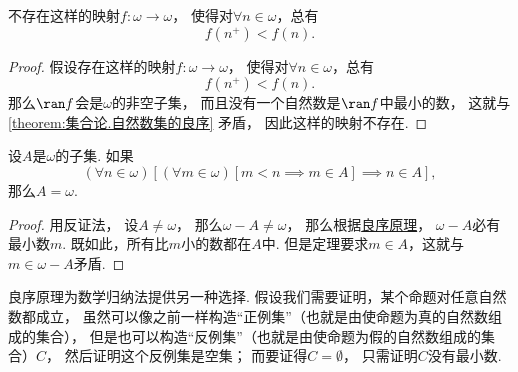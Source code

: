 \begin{theorem}
不存在这样的映射\(f\colon\omega\to\omega\)，
使得对\(\forall n \in \omega\)，总有\begin{equation*}
	f(n^+) < f(n).
\end{equation*}
\begin{proof}
假设存在这样的映射\(f\colon\omega\to\omega\)，
使得对\(\forall n \in \omega\)，总有\begin{equation*}
	f(n^+) < f(n).
\end{equation*}
那么\(\ran f\)会是\(\omega\)的非空子集，
而且没有一个自然数是\(\ran f\)中最小的数，
这就与\cref{theorem:集合论.自然数集的良序} 矛盾，
因此这样的映射不存在.
\end{proof}
\end{theorem}

\begin{theorem}[强归纳原理]\label{theorem:集合论.归纳原理2}
设\(A\)是\(\omega\)的子集.
如果\begin{equation*}
	(\forall n \in \omega)[
		(\forall m \in \omega)[m < n \implies m \in A]
		\implies
		n \in A
	],
\end{equation*}
那么\(A = \omega\).
\begin{proof}
用反证法，
设\(A \neq \omega\)，
那么\(\omega - A \neq \omega\)，
那么根据\hyperref[theorem:集合论.自然数集的良序]{良序原理}，
\(\omega - A\)必有最小数\(m\).
既如此，所有比\(m\)小的数都在\(A\)中.
但是定理要求\(m \in A\)，这就与\(m \in \omega - A\)矛盾.
\end{proof}
\end{theorem}

良序原理为数学归纳法提供另一种选择.
假设我们需要证明，某个命题对任意自然数都成立，
虽然可以像之前一样构造“正例集”（也就是由使命题为真的自然数组成的集合），
但是也可以构造“反例集”（也就是由使命题为假的自然数组成的集合）\(C\)，
然后证明这个反例集是空集；
而要证得\(C = \emptyset\)，
只需证明\(C\)没有最小数.

